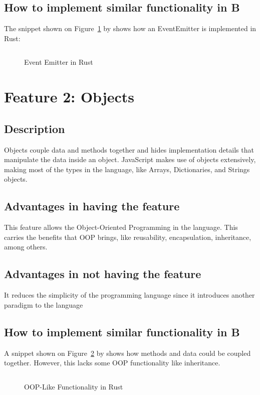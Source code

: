 \documentclass{article}
\newcommand{\rust}[1]{\inputminted{rust}{samples/rust/#1.rs}}
\begin{document}
  \subsection{How to implement similar functionality in B}
  The snippet shown on Figure~\ref{fig:event-emitter} by \cite{shemsedinov}
  shows how an EventEmitter is implemented in Rust:

  \begin{figure}[H]
    \inputminted[fontsize=\small]{rust}{samples/rust/event-emitter.rs}
    \caption{Event Emitter in Rust}
    \label{fig:event-emitter}
  \end{figure}


  \section{Feature 2: Objects}
  \subsection{Description}
  Objects couple data and methods together and hides implementation details that
  manipulate the data inside an object. JavaScript makes use of objects
  extensively, making most of the types in the language, like Arrays,
  Dictionaries, and Strings objects.

  \subsection{Advantages in having the feature}
  This feature allows the Object-Oriented Programming in the language. This
  carries the benefits that OOP brings, like reusability, encapsulation,
  inheritance, among others.

  \subsection{Advantages in not having the feature}
  It reduces the simplicity of the programming language since it introduces
  another paradigm to the language

  \subsection{How to implement similar functionality in B}
  A snippet shown on Figure~\ref{fig:objects} by \cite{klabnik_nichols_2018}
  shows how methods and data could be coupled together. However, this lacks some
  OOP functionality like inheritance.

  \begin{figure}[ht]
    \rust{objects}
    \caption{OOP-Like Functionality in Rust}
    \label{fig:objects}
  \end{figure}


  \newpage
  \nocite{*} \printbibliography[heading=bibintoc,title={References}]{}
\end{document}
